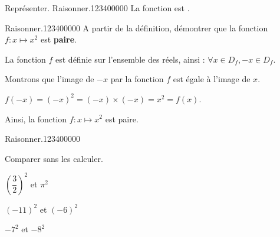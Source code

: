\begin{pageAD}
\begin{ExoCad}{Représenter. Raisonner.}{1234}{0}{0}{0}{0}{0}
{La fonction est .\dotfill
}
\end{ExoCad} 

\begin{ExoCad}{Raisonner.}{1234}{0}{0}{0}{0}{0}
A partir de la définition, démontrer que la fonction $f:x\mapsto x^2$ est \textbf{paire}.


La fonction $f$ est définie sur l'ensemble des réels, ainsi : $\forall x\in D_f,-x\in D_f$.

Montrons que l'image de $-x$ par la fonction $f$ est égale à l'image de $x$.

$f(-x)=(-x)^2=(-x)\times(-x)=x^2=f(x)$.

Ainsi, la fonction $f :x\mapsto x^2$ est paire.
\end{ExoCad} 


\begin{ExoCad}{Raisonner.}{1234}{0}{0}{0}{0}{0}

Comparer sans les calculer.
\begin{description}[leftmargin=*]
\item $\left( \dfrac{3}{2} \right)^2$ et  $\pi^2$



\item $(-11)^2$ et $(-6)^2$



 
\item $-7^2$ et $-8^2$


\end{description}

\end{ExoCad} 



\end{pageAD}

